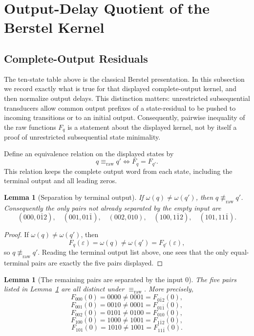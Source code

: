 \documentclass[11pt,letterpaper]{article}
\numberwithin{equation}{section}
\theoremstyle{plain}
\newtheorem{lemma}[theorem]{Lemma}
\theoremstyle{definition}
\theoremstyle{remark}
\begin{document}
\section{Output-Delay Quotient of the Berstel Kernel}\label{sec:minimality}

\subsection{Complete-Output Residuals}

The ten-state table above is the classical Berstel presentation.  In this
subsection we record exactly what is true for that displayed complete-output
kernel, and then normalize output delays.  This distinction matters:
unrestricted subsequential transducers allow common output prefixes of a
state-residual to be pushed to incoming transitions or to an initial output.
Consequently, pairwise inequality of the raw functions $F_q$ is a statement
about the displayed kernel, not by itself a proof of unrestricted
subsequential state minimality.

Define an equivalence relation on the displayed states by
\[
q\equiv_{\mathrm{raw}} q' \iff F_q=F_{q'}.
\]
This relation keeps the complete output word from each state, including the
terminal output and all leading zeros.

\begin{lemma}[Separation by terminal output]\label{lem:terminal-separation}
If $\omega(q)\neq \omega(q')$, then $q\not\equiv_{\mathrm{raw}} q'$.
Consequently the only
pairs not already separated by the empty input are
\[
(000,0\bar{1}2),\quad
(001,01\bar{1}),\quad
(002,010),\quad
(100,1\bar{1}2),\quad
(101,11\bar{1}).
\]
\end{lemma}

\begin{proof}
If $\omega(q)\neq \omega(q')$, then
\[
F_q(\varepsilon)=\omega(q)\neq \omega(q')=F_{q'}(\varepsilon),
\]
so $q\not\equiv_{\mathrm{raw}} q'$.  Reading the terminal output list above,
one sees that the only equal-terminal pairs are exactly the five pairs
displayed.
\end{proof}

\begin{lemma}[The remaining pairs are separated by the input $0$]\label{lem:zero-separation}
The five pairs listed in Lemma~\ref{lem:terminal-separation} are all
distinct under $\equiv_{\mathrm{raw}}$.  More precisely,
\[
F_{000}(0)=0000 \neq 0001 = F_{0\bar{1}2}(0),
\]
\[
F_{001}(0)=0010 \neq 0001 = F_{01\bar{1}}(0),
\]
\[
F_{002}(0)=0101 \neq 0100 = F_{010}(0),
\]
\[
F_{100}(0)=1000 \neq 1001 = F_{1\bar{1}2}(0),
\]
\[
F_{101}(0)=1010 \neq 1001 = F_{11\bar{1}}(0).
\]
\end{lemma}
\end{document}
